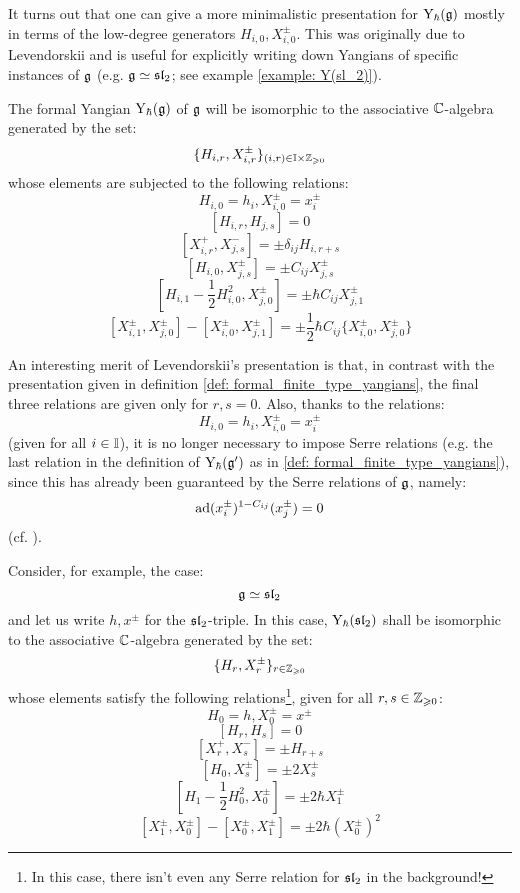         It turns out that one can give a more minimalistic presentation for $\rmY_{\hbar}(\g)$ mostly in terms of the low-degree generators $H_{i, 0}, X_{i, 0}^{\pm}$. This was originally due to Levendorskii and is useful for explicitly writing down Yangians of specific instances of $\g$ (e.g. $\g \cong \sl_2$; see example \ref{example: Y(sl_2)}).
        \begin{theorem} \label{theorem: levendorskii_presentation}
            \cite[Theorem 1.2]{levendorskii_finite_type_yangians_presentation} The formal Yangian $\rmY_{\hbar}(\g)$ of $\g$ will be isomorphic to the associative $\bbC$-algebra generated by the set:
                $$\{ H_{i, r}, X_{i, r}^{\pm} \}_{(i, r) \in \simpleroots \x \Z_{\geq 0}}$$
            whose elements are subjected to the following relations:
                $$H_{i, 0} = h_i, X_{i, 0}^{\pm} = x_i^{\pm}$$
                $$[ H_{i, r}, H_{j, s} ] = 0$$
                $$[ X_{i, r}^+, X_{j, s}^- ] = \pm \delta_{ij} H_{i, r + s}$$
                $$[ H_{i, 0}, X_{j, s}^{\pm} ] = \pm C_{ij} X_{j, s}^{\pm}$$
                $$\left[ H_{i, 1} - \frac12 H_{i, 0}^2, X_{j, 0}^{\pm} \right] = \pm \hbar C_{ij} X_{j, 1}^{\pm}$$
                $$[ X_{i, 1}^{\pm}, X_{j, 0}^{\pm} ] - [ X_{i, 0}^{\pm}, X_{j, 1}^{\pm} ] = \pm \frac12 \hbar C_{ij} \{X_{i, 0}^{\pm}, X_{j, 0}^{\pm}\}$$
        \end{theorem}
        \begin{remark}
            An interesting merit of Levendorskii's presentation is that, in contrast with the presentation given in definition \ref{def: formal_finite_type_yangians}, the final three relations are given only for $r, s = 0$. Also, thanks to the relations:
                $$H_{i, 0} = h_i, X_{i, 0}^{\pm} = x_i^{\pm}$$
            (given for all $i \in \simpleroots$), it is no longer necessary to impose Serre relations (e.g. the last relation in the definition of $\rmY_{\hbar}(\g')$ as in \ref{def: formal_finite_type_yangians}), since this has already been guaranteed by the Serre relations of $\g$, namely:
                $$\ad(x_i^{\pm})^{1 - C_{ij}}( x_j^{\pm} ) = 0$$
            (cf. \cite{humphreys_lie_algebras}).
        \end{remark}
        \begin{example} \label{example: Y(sl_2)}
            Consider, for example, the case:
                $$\g \cong \sl_2$$
            and let us write $h, x^{\pm}$ for the $\sl_2$-triple. In this case, $\rmY_{\hbar}(\sl_2)$ shall be isomorphic to the associative $\bbC$-algebra generated by the set:
                $$\{ H_r, X_r^{\pm} \}_{r \in \Z_{\geq 0}}$$
            whose elements satisfy the following relations\footnote{In this case, there isn't even any Serre relation for $\sl_2$ in the background!}, given for all $r, s \in \Z_{\geq 0}$:
                $$H_0 = h, X_0^{\pm} = x^{\pm}$$
                $$[ H_r, H_s ] = 0$$
                $$[ X_r^+, X_s^- ] = \pm H_{r + s}$$
                $$[ H_0, X_s^{\pm} ] = \pm 2 X_s^{\pm}$$
                $$\left[ H_1 - \frac12 H_0^2, X_0^{\pm} \right] = \pm 2 \hbar X_1^{\pm}$$
                $$[ X_1^{\pm}, X_0^{\pm} ] - [ X_0^{\pm}, X_1^{\pm} ] = \pm 2\hbar (X_0^{\pm})^2$$
        \end{example}

